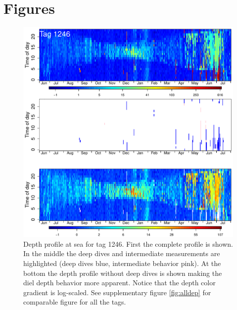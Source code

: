 \section*{Figures}
\begin{figure}[ht]
  \centering
  \includegraphics[width=\linewidth]{fig1}
  \caption{Depth profile at sea for tag 1246. First the complete profile is shown. In the middle the deep dives and intermediate measurements are highlighted (deep dives blue, intermediate behavior pink). At the bottom the depth profile without deep dives is shown making the diel depth behavior more apparent. Notice that the depth color gradient is log-scaled. See supplementary figure \ref{fig:alldep} for comparable figure for all the tags.}
  \label{fig:heatmap}
\end{figure}


